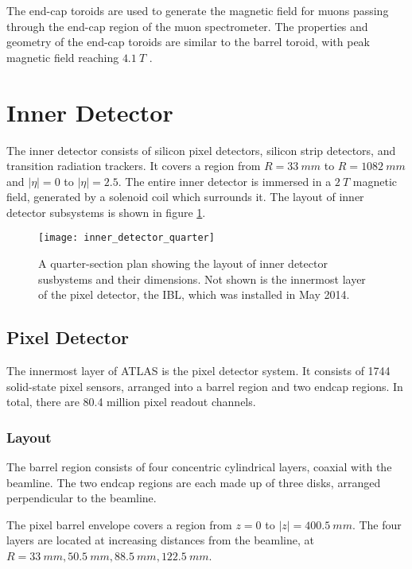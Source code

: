 The end-cap toroids are used to generate the magnetic field for muons
passing through the end-cap region of the muon spectrometer. The
properties and geometry of the end-cap toroids are similar to the
barrel toroid, with peak magnetic field reaching $4.1~T$ \cite{atlas-detector-2008}.

\section{Inner Detector}
The inner detector consists of silicon pixel detectors, silicon strip
detectors, and transition radiation trackers. It covers a region from
$R = 33~mm$ to $R = 1082~mm$ and $|\eta| = 0$ to $|\eta| = 2.5$. The entire inner
detector is immersed in a $2~T$ magnetic field, generated by a
solenoid coil which surrounds it.\cite{atlas-detector-2008} The layout of inner detector
subsystems is shown in figure \ref{fig:inner_detector_quarter}.

\begin{figure}[h]
\texttt{[image: inner\_detector\_quarter]}
\caption{A quarter-section plan showing the layout of inner detector
  susbystems and their dimensions. Not shown is the innermost layer of
the pixel detector, the IBL, which was installed in May 2014.}
\label{fig:inner_detector_quarter}
\end{figure}

\subsection{Pixel Detector}

The innermost layer of ATLAS is the pixel detector system. It consists
of 1744 solid-state pixel sensors, arranged into a barrel region and two endcap
regions. In total, there are 80.4 million pixel readout channels. \cite{atlas-detector-2008}

\subsubsection{Layout}
The barrel region consists of four
concentric cylindrical layers, coaxial with the beamline. The two endcap regions are each made up
of three disks, arranged perpendicular to the beamline.

The pixel barrel envelope covers a region
from $z = 0$ to $|z|  = 400.5~mm$. The four layers are located at
increasing distances from the beamline, at $R = 33~mm, 50.5~mm,
88.5~mm, 122.5~mm$.


